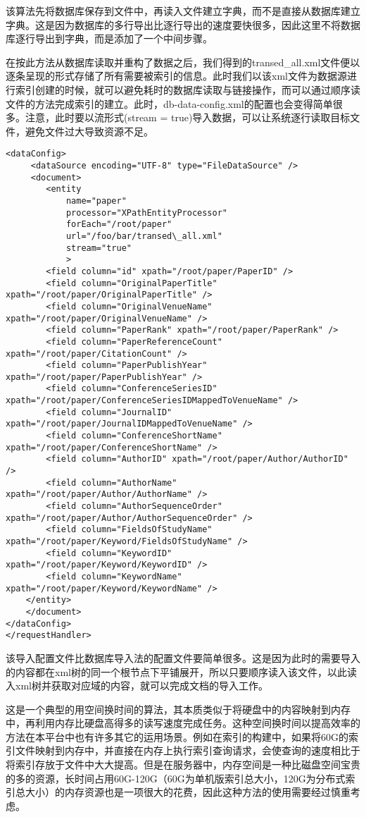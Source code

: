 该算法先将数据库保存到文件中，再读入文件建立字典，而不是直接从数据库建立字典。这是因为数据库的多行导出比逐行导出的速度要快很多，因此这里不将数据库逐行导出到字典，而是添加了一个中间步骤。

在按此方法从数据库读取并重构了数据之后，我们得到的transed\_all.xml文件便以逐条呈现的形式存储了所有需要被索引的信息。此时我们以该xml文件为数据源进行索引创建的时候，就可以避免耗时的数据库读取与链接操作，而可以通过顺序读文件的方法完成索引的建立。此时，db-data-config.xml的配置也会变得简单很多。注意，此时要以流形式(stream = true)导入数据，可以让系统逐行读取目标文件，避免文件过大导致资源不足。

\begin{lstlisting}[caption={从文件导入索引的db-data-config.xml}, label=filetoindex, escapeinside="", numbers=none]
<dataConfig>
	 <dataSource encoding="UTF-8" type="FileDataSource" />
	 <document>
	    <entity
	        name="paper"
			processor="XPathEntityProcessor"
			forEach="/root/paper"
			url="/foo/bar/transed\_all.xml"
			stream="true"
			>
		<field column="id" xpath="/root/paper/PaperID" />
		<field column="OriginalPaperTitle" xpath="/root/paper/OriginalPaperTitle" />
		<field column="OriginalVenueName" xpath="/root/paper/OriginalVenueName" />
		<field column="PaperRank" xpath="/root/paper/PaperRank" />
		<field column="PaperReferenceCount" xpath="/root/paper/CitationCount" />
		<field column="PaperPublishYear" xpath="/root/paper/PaperPublishYear" />
		<field column="ConferenceSeriesID" xpath="/root/paper/ConferenceSeriesIDMappedToVenueName" />
		<field column="JournalID" xpath="/root/paper/JournalIDMappedToVenueName" />
		<field column="ConferenceShortName" xpath="/root/paper/ConferenceShortName" />
		<field column="AuthorID" xpath="/root/paper/Author/AuthorID" />
		<field column="AuthorName" xpath="/root/paper/Author/AuthorName" />
		<field column="AuthorSequenceOrder" xpath="/root/paper/Author/AuthorSequenceOrder" />
		<field column="FieldsOfStudyName" xpath="/root/paper/Keyword/FieldsOfStudyName" />
		<field column="KeywordID" xpath="/root/paper/Keyword/KeywordID" />
		<field column="KeywordName" xpath="/root/paper/Keyword/KeywordName" />
    </entity>
    </document>
</dataConfig>
</requestHandler>
\end{lstlisting}

该导入配置文件比数据库导入法的配置文件要简单很多。这是因为此时的需要导入的内容都在xml树的同一个根节点下平铺展开，所以只要顺序读入该文件，以此读入xml树并获取对应域的内容，就可以完成文档的导入工作。

这是一个典型的用空间换时间的算法，其本质类似于将硬盘中的内容映射到内存中，再利用内存比硬盘高得多的读写速度完成任务。这种空间换时间以提高效率的方法在本平台中也有许多其它的运用场景。例如在索引的构建中，如果将60G的索引文件映射到内存中，并直接在内存上执行索引查询请求，会使查询的速度相比于将索引存放于文件中大大提高。但是在服务器中，内存空间是一种比磁盘空间宝贵的多的资源，长时间占用60G-120G（60G为单机版索引总大小，120G为分布式索引总大小）的内存资源也是一项很大的花费，因此这种方法的使用需要经过慎重考虑。
